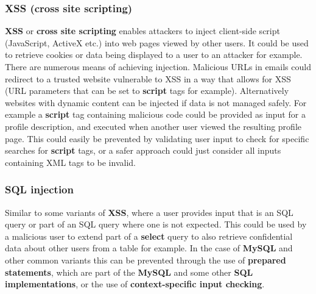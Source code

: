 \documentclass[final]{article}
\newcommand{\np}{\vspace{8pt} \\}
\begin{document}
\subsubsection{XSS (cross site scripting)}
\textbf{XSS} or \textbf{cross site scripting} enables attackers to inject client-side script (JavaScript, ActiveX etc.) into web pages viewed by other users. It could be used to retrieve cookies or data being displayed to a user to an attacker for example. \np
There are numerous means of achieving injection. Malicious URLs in emails could redirect to a trusted website vulnerable to XSS in a way that allows for XSS (URL parameters that can be set to \textbf{script} tags for example). Alternatively websites with dynamic content can be injected if data is not managed safely. For example a \textbf{script} tag containing malicious code could be provided as input for a profile description, and executed when another user viewed the resulting profile page. This could easily be prevented by validating user input to check for specific searches for \textbf{script} tags, or a safer approach could just consider all inputs containing XML tags to be invalid.

\subsubsection{SQL injection}
Similar to some variants of \textbf{XSS}, where a user provides input that is an SQL query or part of an SQL query where one is not expected. This could be used by a malicious user to extend part of a \textbf{select} query to also retrieve confidential data about other users from a table for example. In the case of \textbf{MySQL} and other common variants this can be prevented through the use of \textbf{prepared statements}, which are part of the \textbf{MySQL} and some other \textbf{SQL implementations}, or the use of \textbf{context-specific input checking}.
\end{document}
